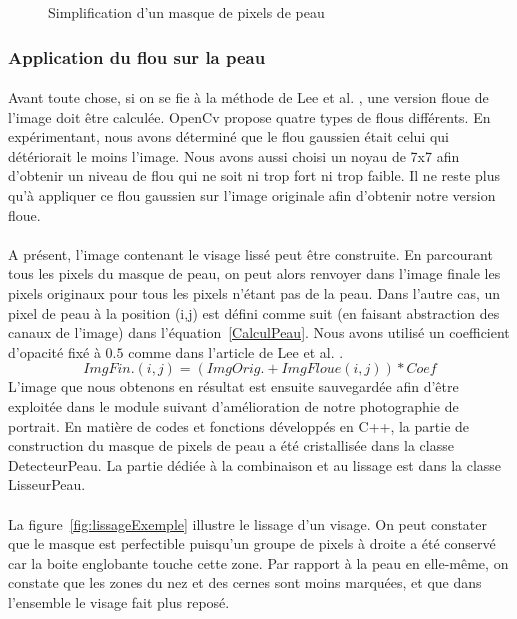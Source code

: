 \documentclass[11pt, french]{report-rd-info}
\begin{document}
\begin{figure}[htp]
 \caption{Simplification d'un masque de pixels de peau}
 \label{fig:MasquePeau}
\end{figure}


\subsubsection{Application du flou sur la peau}
\paragraph*{}
Avant toute chose, si on se fie à la méthode de Lee et al. \cite{Lee}, une version floue de l'image doit être calculée. OpenCv propose quatre types de flous différents. En expérimentant, nous avons déterminé que le flou gaussien était celui qui détériorait le moins l'image. Nous avons aussi choisi un noyau de 7x7 afin d'obtenir un niveau de flou qui ne soit ni trop fort ni trop faible. Il ne reste plus qu'à appliquer ce flou gaussien sur l'image originale afin d'obtenir notre version floue.

\paragraph*{}
A présent, l'image contenant le visage lissé peut être construite. En parcourant tous les pixels du masque de peau, on peut alors renvoyer dans l'image finale les pixels originaux pour tous les pixels n'étant pas de la peau. Dans l'autre cas, un pixel de peau à la position (i,j) est défini comme suit (en faisant abstraction des canaux de l'image) dans l'équation~\ref{CalculPeau}. Nous avons utilisé un coefficient d'opacité fixé à $0.5$ comme dans l'article de Lee et al. \cite{Lee}.
\begin{equation}
ImgFin.(i,j) = (ImgOrig. + ImgFloue(i,j)) * Coef
\label{CalculPeau}
\end{equation}
L'image que nous obtenons en résultat est ensuite sauvegardée afin d'être exploitée dans le module suivant d'amélioration de notre photographie de portrait. En matière de codes et fonctions développés en C++, la partie de construction du masque de pixels de peau a été cristallisée dans la classe DetecteurPeau. La partie dédiée à la combinaison et au lissage est dans la classe LisseurPeau.

\paragraph*{}
La figure~\ref{fig:lissageExemple} illustre le lissage d'un visage. On peut constater que le masque est perfectible puisqu'un groupe de pixels à droite a été conservé car la boite englobante touche cette zone. Par rapport à la peau en elle-même, on constate que les zones du nez et des cernes sont moins marquées, et que dans l'ensemble le visage fait plus reposé.
\end{document}
